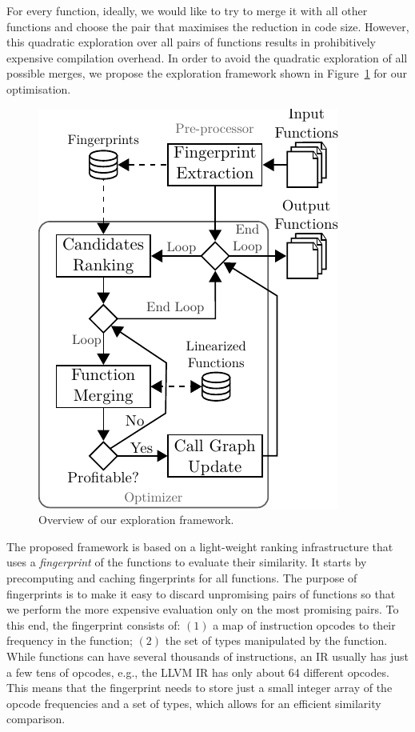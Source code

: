 For every function, ideally, we would like to try to merge it with all other functions and choose the pair that maximises the reduction in code size.
However, this quadratic exploration over all pairs of functions results in prohibitively expensive compilation overhead.
In order to avoid the quadratic exploration of all possible merges, we propose the exploration framework shown in Figure~\ref{fig:func-merge-opt-arch} for our optimisation.
\begin{figure}[t!]
  \centering
  \includegraphics[width=0.7\linewidth]{src/merging-optimisation/figs/func-merge-opt-arch.pdf}
  \caption{Overview of our exploration framework.}
  \label{fig:func-merge-opt-arch}
\end{figure}

The proposed framework is based on a light-weight ranking infrastructure that uses a \textit{fingerprint} of the functions to evaluate
their similarity. It starts by precomputing and caching fingerprints for all functions. The purpose of fingerprints is to make it easy
to discard unpromising pairs of functions so that we perform the more expensive evaluation only on the most promising pairs.
To this end, the fingerprint consists of: $(1)$ a map of instruction opcodes to their frequency in the function; $(2)$ the set of types
manipulated by the function. While functions can have several thousands of instructions, an IR usually has just a few tens of opcodes,
e.g., the LLVM IR has only about 64 different opcodes. This means that the fingerprint needs to store just a small integer array of the
opcode frequencies and a set of types, which allows for an efficient similarity comparison.

